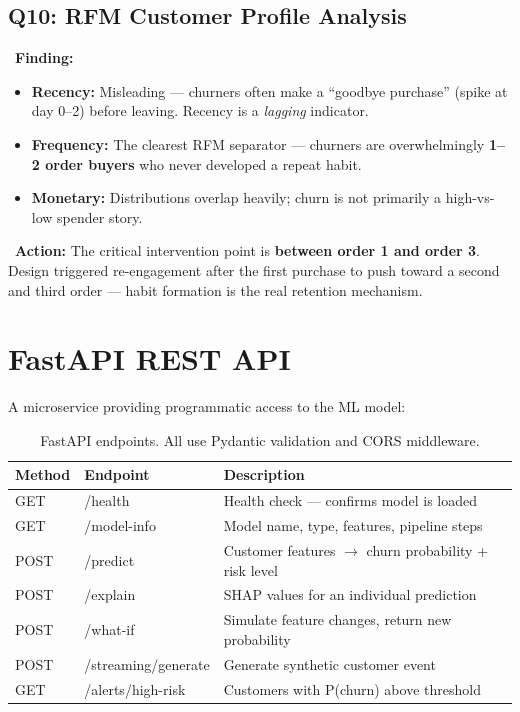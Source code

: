\documentclass[11pt,a4paper]{article}
\begin{document}
\subsection{Q10: RFM Customer Profile Analysis}

\begin{findingbox}
\faSearch\ \textbf{Finding:}
\begin{itemize}[leftmargin=*, nosep]
    \item \textbf{Recency:} Misleading --- churners often make a ``goodbye purchase'' (spike at day 0--2) before leaving. Recency is a \emph{lagging} indicator.
    \item \textbf{Frequency:} The clearest RFM separator --- churners are overwhelmingly \textbf{1--2 order buyers} who never developed a repeat habit.
    \item \textbf{Monetary:} Distributions overlap heavily; churn is not primarily a high-vs-low spender story.
\end{itemize}
\end{findingbox}

\begin{actionbox}
\faArrowRight\ \textbf{Action:} The critical intervention point is \textbf{between order 1 and order 3}. Design triggered re-engagement after the first purchase to push toward a second and third order --- habit formation is the real retention mechanism.
\end{actionbox}

\section{FastAPI REST API}

A microservice providing programmatic access to the ML model:

\begin{table}[H]
\centering
{}
\begin{tabularx}{\textwidth}{>{\ttfamily}l >{\ttfamily}l X}
\toprule
\textbf{\rmfamily Method} & \textbf{\rmfamily Endpoint} & \textbf{\rmfamily Description} \\
\midrule
GET & /health & Health check --- confirms model is loaded \\
GET & /model-info & Model name, type, features, pipeline steps \\
POST & /predict & Customer features $\rightarrow$ churn probability + risk level \\
POST & /explain & SHAP values for an individual prediction \\
POST & /what-if & Simulate feature changes, return new probability \\
POST & /streaming/generate & Generate synthetic customer event \\
GET & /alerts/high-risk & Customers with P(churn) above threshold \\
\bottomrule
\end{tabularx}
\caption{FastAPI endpoints. All use Pydantic validation and CORS middleware.}
\end{table}
\end{document}
